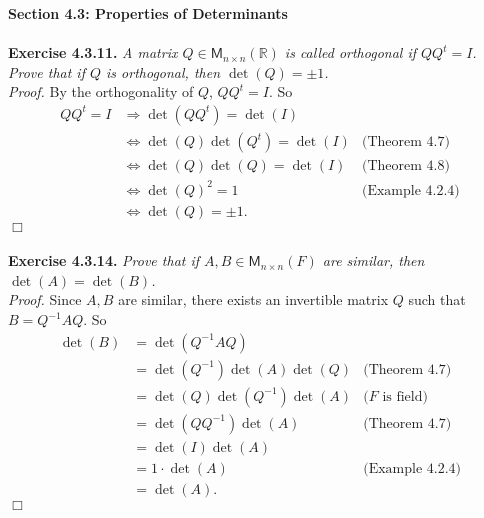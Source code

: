 \documentclass{article}
\begin{document}



\textbf{\large Section 4.3: Properties of Determinants} \\\\






\textbf{Exercise 4.3.11.}
\emph{A matrix $Q \in \mathsf{M}_{n \times n}(\mathbb{R})$
is called orthogonal if $QQ^t = I$.
Prove that if $Q$ is orthogonal, then $\det(Q) = \pm 1$.} \\

\emph{Proof.}
By the orthogonality of $Q$, $QQ^t = I$. So
\begin{align*}
QQ^t = I
&\Longrightarrow
\det(QQ^t) = \det(I) \\
&\Longleftrightarrow
\det(Q)\det(Q^t) = \det(I)
  &\text{(Theorem 4.7)} \\
&\Longleftrightarrow
\det(Q)\det(Q) = \det(I)
  &\text{(Theorem 4.8)} \\
&\Longleftrightarrow
\det(Q)^2 = 1
  &\text{(Example 4.2.4)} \\
&\Longleftrightarrow
\det(Q) = \pm 1.
\end{align*}
$\Box$ \\\\






\textbf{Exercise 4.3.14.}
\emph{Prove that if $A, B \in \mathsf{M}_{n \times n}(F)$
are similar, then $\det(A) = \det(B)$.} \\

\emph{Proof.}
Since $A, B$ are similar, there exists an invertible matrix $Q$
such that $B = Q^{-1}AQ$.
So
\begin{align*}
\det(B)
&= \det(Q^{-1}AQ) \\
&= \det(Q^{-1})\det(A)\det(Q)
  &\text{(Theorem 4.7)} \\
&= \det(Q)\det(Q^{-1})\det(A)
  &\text{($F$ is field)} \\
&= \det(Q Q^{-1})\det(A)
  &\text{(Theorem 4.7)} \\
&= \det(I)\det(A) \\
&= 1 \cdot \det(A)
  &\text{(Example 4.2.4)} \\
&= \det(A).
\end{align*}
$\Box$ \\\\
\end{document}

